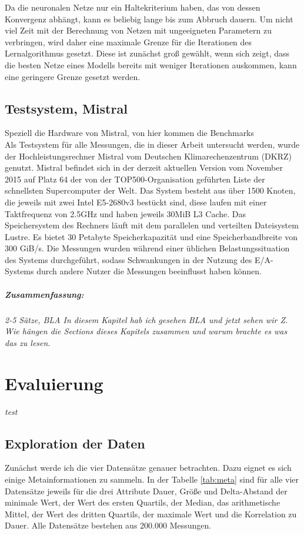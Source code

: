 \documentclass[
	12pt,
	a4paper,
	BCOR10mm,
	DIV14,
	listof=totoc,
	bibliography=totoc,
	headsepline
]{scrreprt}
\begin{document}
Da die neuronalen Netze nur ein Haltekriterium haben, das von dessen Konvergenz abhängt, kann es beliebig lange bis zum Abbruch dauern. Um nicht viel Zeit mit der Berechnung von Netzen mit ungeeigneten Parametern zu verbringen, wird daher eine maximale Grenze für die Iterationen des Lernalgorithmus gesetzt. Diese ist zunächst groß gewählt, wenn sich zeigt, dass die besten Netze eines Modells bereits mit weniger Iterationen auskommen, kann eine geringere Grenze gesetzt werden.

\section{Testsystem, Mistral}
\label{impl:testsystem}
Speziell die Hardware von Mistral, von hier kommen die Benchmarks\\

Als Testsystem für alle Messungen, die in dieser Arbeit untersucht werden, wurde der Hochleistungsrechner Mistral vom Deutschen Klimarechenzentrum (DKRZ) genutzt. Mistral befindet sich in der derzeit aktuellen Version vom November 2015 auf Platz 64 der von der TOP500-Organisation geführten Liste der schnellsten Supercomputer der Welt. Das System besteht aus über 1500 Knoten, die jeweils mit zwei Intel E5-2680v3 bestückt sind, diese laufen mit einer Taktfrequenz von 2.5GHz und haben jeweils 30MiB L3 Cache. Das Speichersystem des Rechners läuft mit dem parallelen und verteilten Dateisystem Lustre. Es bietet 30 Petabyte Speicherkapazität und eine Speicherbandbreite von 300 GiB/s. Die Messungen wurden während einer üblichen Belastungssituation des Systems durchgeführt, sodass Schwankungen in der Nutzung des E/A-Systems durch andere Nutzer die Messungen beeinflusst haben können.


\paragraph{Zusammenfassung:}
\textit{2-5 Sätze, BLA In diesem Kapitel hab ich gesehen BLA und jetzt sehen wir Z. Wie hängen die Sections dieses Kapitels zusammen und warum brachte es was das zu lesen.}

\chapter{Evaluierung}
\textit{%
	test
}
\bigskip

\section{Exploration der Daten}
\label{exploration}
Zunächst werde ich die vier Datensätze genauer betrachten. Dazu eignet es sich einige Metainformationen zu sammeln. In der Tabelle \ref{tab:meta} sind für alle vier Datensätze jeweils für die drei Attribute Dauer, Größe und Delta-Abstand der minimale Wert, der Wert des ersten Quartils, der Median, das arithmetische Mittel, der Wert des dritten Quartils, der maximale Wert und die Korrelation zu Dauer. Alle Datensätze bestehen aus 200.000 Messungen.\\
\end{document}
